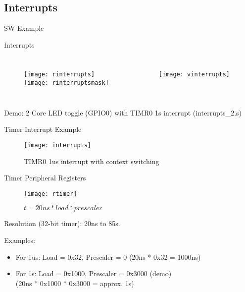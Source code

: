\documentclass[aspectratio=169]{beamer}
\begin{document}
\subsection{Interrupts}
\begin{frame}[c]
\begin{center}
\Huge SW Example
\end{center}
\end{frame}

\begin{frame}[t]{Interrupts}
\begin{columns}[t]
\begin{figure}
\texttt{[image: rinterrupts]}\\
\vspace{.5cm}
\texttt{[image: rinterruptsmask]}
\end{figure}
\begin{figure}
\texttt{[image: vinterrupts]}
\end{figure}
\end{columns}
\vspace{1cm}
Demo: 2 Core LED toggle (GPIO0) with TIMR0 1s interrupt (interrupts\_2.s)
\end{frame}

\begin{frame}{Timer Interrupt Example}
    \begin{figure}
        \centering
        \texttt{[image: interrupts]}
        \caption{TIMR0 1us interrupt with context switching}
        \label{fig:my_label}
    \end{figure}
\end{frame}

\begin{frame}{Timer Peripheral Registers}
    \begin{figure}
        \centering
        \texttt{[image: rtimer]}
        \caption{$t = 20{ns} * {load} * {prescaler}$}
        \label{}
    \end{figure}
    Resolution (32-bit timer): 20ns to 85s.
    
    Examples: 
    \begin{itemize}
        \item For 1us: Load = 0x32, Prescaler = 0 (20ns * 0x32 = 1000ns)
        \item For 1s:  Load = 0x1000, Prescaler = 0x3000 (demo)\\(20ns * 0x1000 * 0x3000 = approx. 1s)
    \end{itemize}
\end{frame}
\end{document}

